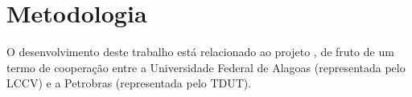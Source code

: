 \chapter{Metodologia}\label{chap:metodologia}


O desenvolvimento deste trabalho está relacionado ao projeto \integrispan, de fruto de um termo de cooperação entre a Universidade Federal de Alagoas (representada pelo LCCV) e a Petrobras (representada pelo TDUT).

